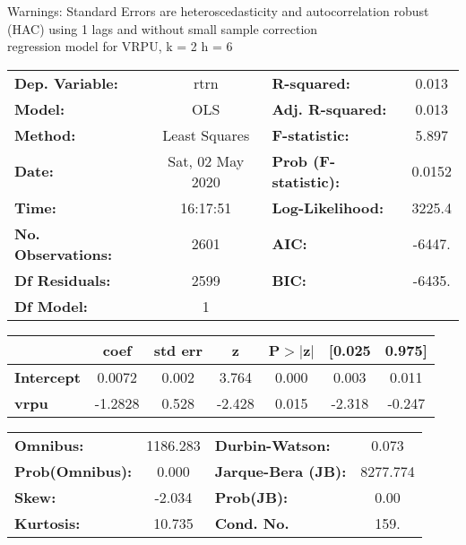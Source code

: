 Warnings: \newline
 [1] Standard Errors are heteroscedasticity and autocorrelation robust (HAC) using 1 lags and without small sample correction\\ 

regression model for VRPU, k = 2 h = 6\begin{center}
\begin{tabular}{lclc}
\toprule
\textbf{Dep. Variable:}    &       rtrn       & \textbf{  R-squared:         } &     0.013   \\
\textbf{Model:}            &       OLS        & \textbf{  Adj. R-squared:    } &     0.013   \\
\textbf{Method:}           &  Least Squares   & \textbf{  F-statistic:       } &     5.897   \\
\textbf{Date:}             & Sat, 02 May 2020 & \textbf{  Prob (F-statistic):} &   0.0152    \\
\textbf{Time:}             &     16:17:51     & \textbf{  Log-Likelihood:    } &    3225.4   \\
\textbf{No. Observations:} &        2601      & \textbf{  AIC:               } &    -6447.   \\
\textbf{Df Residuals:}     &        2599      & \textbf{  BIC:               } &    -6435.   \\
\textbf{Df Model:}         &           1      & \textbf{                     } &             \\
\bottomrule
\end{tabular}
\begin{tabular}{lcccccc}
                   & \textbf{coef} & \textbf{std err} & \textbf{z} & \textbf{P$> |$z$|$} & \textbf{[0.025} & \textbf{0.975]}  \\
\midrule
\textbf{Intercept} &       0.0072  &        0.002     &     3.764  &         0.000        &        0.003    &        0.011     \\
\textbf{vrpu}      &      -1.2828  &        0.528     &    -2.428  &         0.015        &       -2.318    &       -0.247     \\
\bottomrule
\end{tabular}
\begin{tabular}{lclc}
\textbf{Omnibus:}       & 1186.283 & \textbf{  Durbin-Watson:     } &    0.073  \\
\textbf{Prob(Omnibus):} &   0.000  & \textbf{  Jarque-Bera (JB):  } & 8277.774  \\
\textbf{Skew:}          &  -2.034  & \textbf{  Prob(JB):          } &     0.00  \\
\textbf{Kurtosis:}      &  10.735  & \textbf{  Cond. No.          } &     159.  \\
\bottomrule
\end{tabular}
\end{center}

